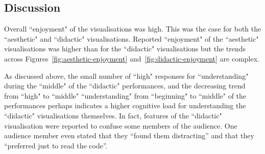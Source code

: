 \documentclass{sig-alternate}
\begin{document}
\subsection{Discussion}

Overall ``enjoyment" of the visualisations was high. This was the case for both the ``aesthetic" and ``didactic" visualisations.
Reported ``enjoyment" of the ``aesthetic" visualisations was higher than for the ``didactic" visualisations but the trends across Figures~\ref{fig:aesthetic-enjoyment} and~\ref{fig:didactic-enjoyment} are complex. 




 As discussed above, the small number of ``high" responses for ``understanding" during the ``middle" of the ``didactic" performances, and the decreasing trend from ``high" to ``middle" ``understanding" from ``beginning" to ``middle" of the performances perhaps indicates a higher cognitive load for understanding the ``didactic" visualisations themselves. In fact, features of the ``didactic" visualisation were reported to confuse some members of the audience. One audience member even stated that they ``found them distracting'' and that they ``preferred just to read the code''.

\end{document}
